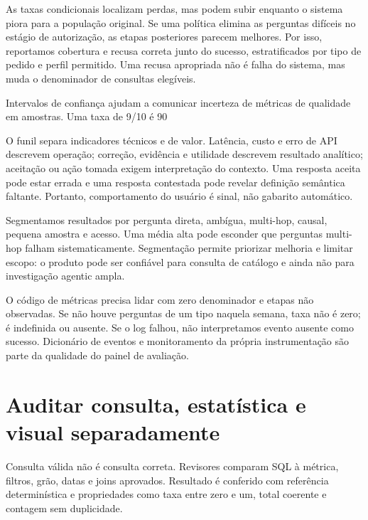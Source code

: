 As taxas condicionais localizam perdas, mas podem subir enquanto o sistema piora para a população original. Se uma política elimina as perguntas difíceis no estágio de autorização, as etapas posteriores parecem melhores. Por isso, reportamos cobertura e recusa correta junto do sucesso, estratificados por tipo de pedido e perfil permitido. Uma recusa apropriada não é falha do sistema, mas muda o denominador de consultas elegíveis.

Intervalos de confiança ajudam a comunicar incerteza de métricas de qualidade em amostras. Uma taxa de 9/10 é 90%

O funil separa indicadores técnicos e de valor. Latência, custo e erro de API descrevem operação; correção, evidência e utilidade descrevem resultado analítico; aceitação ou ação tomada exigem interpretação do contexto. Uma resposta aceita pode estar errada e uma resposta contestada pode revelar definição semântica faltante. Portanto, comportamento do usuário é sinal, não gabarito automático.

Segmentamos resultados por pergunta direta, ambígua, multi-hop, causal, pequena amostra e acesso. Uma média alta pode esconder que perguntas multi-hop falham sistematicamente. Segmentação permite priorizar melhoria e limitar escopo: o produto pode ser confiável para consulta de catálogo e ainda não para investigação agentic ampla.

O código de métricas precisa lidar com zero denominador e etapas não observadas. Se não houve perguntas de um tipo naquela semana, taxa não é zero; é indefinida ou ausente. Se o log falhou, não interpretamos evento ausente como sucesso. Dicionário de eventos e monitoramento da própria instrumentação são parte da qualidade do painel de avaliação.

\section{Auditar consulta, estatística e visual separadamente}

Consulta válida não é consulta correta. Revisores comparam SQL à métrica, filtros, grão, datas e joins aprovados. Resultado é conferido com referência determinística e propriedades como taxa entre zero e um, total coerente e contagem sem duplicidade.

